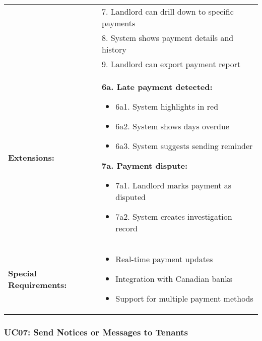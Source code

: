 \documentclass[12pt]{article}
\begin{document}
\begin{tabular}{|p{3cm}|p{11cm}|}
& 7. Landlord can drill down to specific payments \\
& 8. System shows payment details and history \\
& 9. Landlord can export payment report \\
\hline
\textbf{Extensions:} & 
\textbf{6a. Late payment detected:}
\begin{itemize}
    \item 6a1. System highlights in red
    \item 6a2. System shows days overdue
    \item 6a3. System suggests sending reminder
\end{itemize}
\textbf{7a. Payment dispute:}
\begin{itemize}
    \item 7a1. Landlord marks payment as disputed
    \item 7a2. System creates investigation record
\end{itemize} \\
\hline
\textbf{Special Requirements:} & 
\begin{itemize}
    \item Real-time payment updates
    \item Integration with Canadian banks
    \item Support for multiple payment methods
\end{itemize} \\
\hline
\end{tabular}

\subsubsection{UC07: Send Notices or Messages to Tenants}
\end{document}

